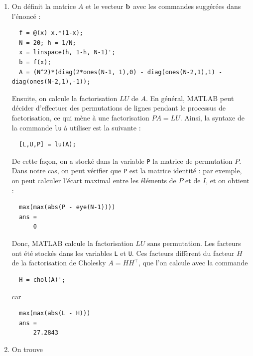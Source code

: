 \begin{enumerate}[label=\alph*)]
  \item On définit la matrice $A$ et le vecteur $\mathbf{b}$ avec les commandes suggérées dans l'énoncé :
  
\begin{verbatim}
  f = @(x) x.*(1-x);
  N = 20; h = 1/N;
  x = linspace(h, 1-h, N-1)'; 
  b = f(x);
  A = (N^2)*(diag(2*ones(N-1, 1),0) - diag(ones(N-2,1),1) - diag(ones(N-2,1),-1));
\end{verbatim}
        
        Ensuite, on calcule la factorisation $LU$ de $A$.
        En général, \textsc{MATLAB} peut décider d'effectuer des permutations de lignes pendant le processus de factorisation, ce qui mène à une factorisation $PA = LU$.
        Ainsi, la syntaxe de la commande \texttt{lu} à utiliser est la suivante :
        
\begin{verbatim}
  [L,U,P] = lu(A);
\end{verbatim}
        
        De cette façon, on a stocké dans la variable \texttt{P} la matrice de permutation $P$.
        Dans notre cas, on peut vérifier que \texttt{P} est la matrice identité : par exemple, on peut calculer l'écart maximal entre les éléments de $P$ et de $I$, et on obtient :
  
\begin{verbatim}
  max(max(abs(P - eye(N-1))))
  ans =
      0
\end{verbatim}
        
        Donc, \textsc{MATLAB} calcule la factorisation $LU$ sans permutation.
        Les facteurs ont été stockés dans les variables \texttt{L} et \texttt{U}.
        Ces facteurs diffèrent du facteur $H$ de la factorisation de Cholesky $A = H H^{\top}$, que l'on calcule avec la commande
  
\begin{verbatim}
  H = chol(A)';
\end{verbatim}
        
        car
        
\begin{verbatim}
  max(max(abs(L - H)))
  ans =
      27.2843
\end{verbatim}
        
  \item On trouve
  
        
        
        

\end{enumerate}
